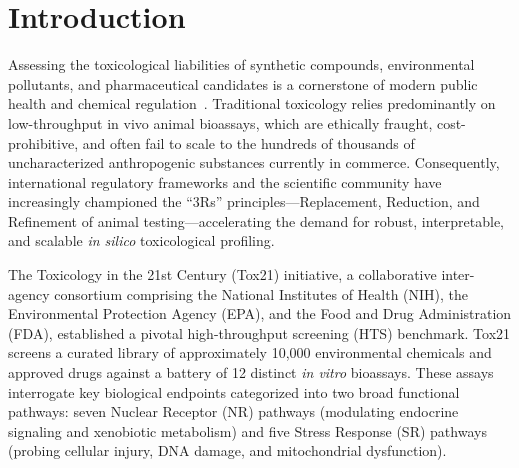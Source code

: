 \section{Introduction}
\label{sec:intro}

Assessing the toxicological liabilities of synthetic compounds, environmental pollutants, and pharmaceutical candidates is a cornerstone of modern public health and chemical regulation~\cite{tox21}. Traditional toxicology relies predominantly on low-throughput in vivo animal bioassays, which are ethically fraught, cost-prohibitive, and often fail to scale to the hundreds of thousands of uncharacterized anthropogenic substances currently in commerce. Consequently, international regulatory frameworks and the scientific community have increasingly championed the ``3Rs'' principles---Replacement, Reduction, and Refinement of animal testing---accelerating the demand for robust, interpretable, and scalable \emph{in silico} toxicological profiling.

The Toxicology in the 21st Century (Tox21) initiative, a collaborative inter-agency consortium comprising the National Institutes of Health (NIH), the Environmental Protection Agency (EPA), and the Food and Drug Administration (FDA), established a pivotal high-throughput screening (HTS) benchmark. Tox21 screens a curated library of approximately 10,000 environmental chemicals and approved drugs against a battery of 12 distinct \emph{in vitro} bioassays. These assays interrogate key biological endpoints categorized into two broad functional pathways: seven Nuclear Receptor (NR) pathways (modulating endocrine signaling and xenobiotic metabolism) and five Stress Response (SR) pathways (probing cellular injury, DNA damage, and mitochondrial dysfunction).

